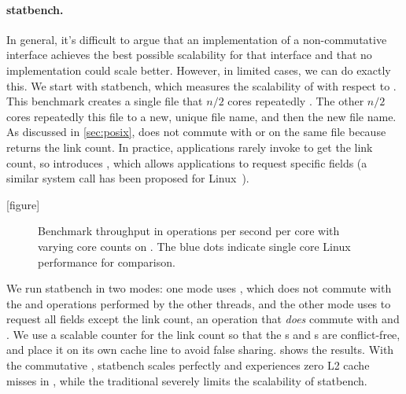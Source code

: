 \paragraph{statbench.} In general, it's difficult to argue that an
implementation of a
non-commutative interface achieves the best possible scalability for
that interface and that no implementation could scale better.  However,
in limited cases, we can do exactly this.  We start with statbench,
which measures the scalability of  with respect to
.  This benchmark creates a single file that $n/2$ cores
repeatedly . The other $n/2$ cores repeatedly
 this file to a new, unique file name, and then 
the new file name.  As discussed in \cref{sec:posix},  does not
commute with  or  on the same file because
 returns the link count.  In practice,
applications rarely invoke  to get the link count, so \sys
introduces , which allows applications to request specific
fields (a similar system call has been proposed for
Linux~\cite{linux:xstat}).


[figure]
\renewcommand{\themysubfigure}{\thefigure(\alph{mysubfigure})}

\begin{figure*}
  
  \label{fig:linkbench}
  \hspace{-.22in}
  
  \label{fig:fdbench}
  \addtocounter{figure}{-1}
  \caption{Benchmark throughput in operations per second per core with
    varying core counts on \sys.
    The blue dots indicate single core Linux
    performance for comparison.}
\end{figure*}

%   

We run statbench in two modes: one mode uses , which does
not commute with the  and  operations performed
by the other threads, and the other mode uses  to request
all fields except the link count, an operation that \emph{does} commute
with  and .  We use a  scalable
counter for the link count so that the
s and s are conflict-free, and place it on
its own cache line to avoid false sharing.
 shows the results.  With the commutative
, statbench scales perfectly and experiences zero L2 cache
misses in , while the traditional  severely
limits the
scalability of statbench.  


